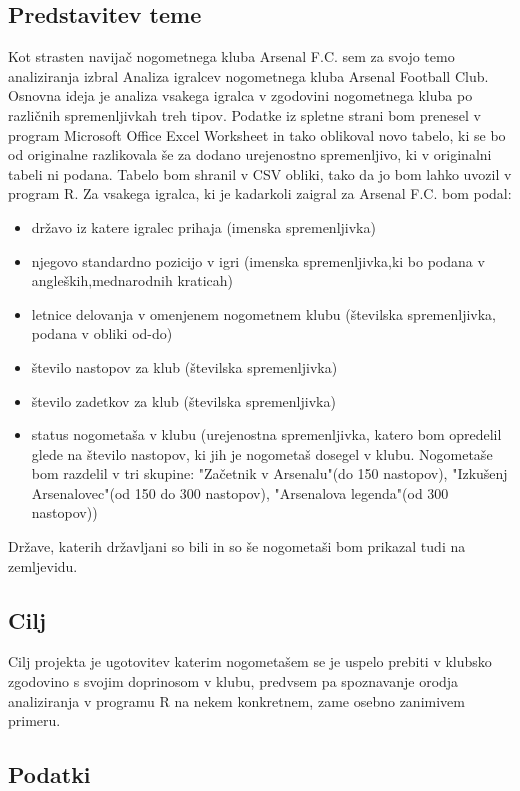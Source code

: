 \documentclass[11pt,a4paper]{article}
\begin{document}
\subsection{Predstavitev teme}
Kot strasten navijač nogometnega kluba Arsenal F.C. sem za svojo temo analiziranja izbral Analiza igralcev nogometnega kluba Arsenal Football Club. Osnovna ideja je analiza vsakega igralca v zgodovini nogometnega kluba po različnih spremenljivkah treh tipov. Podatke iz spletne strani bom prenesel v program  Microsoft Office Excel Worksheet in tako oblikoval novo tabelo, ki se bo od originalne razlikovala še za dodano urejenostno spremenljivo, ki v originalni tabeli ni podana. Tabelo bom shranil v CSV obliki, tako da jo bom lahko uvozil v program  R. Za vsakega igralca, ki je kadarkoli zaigral za Arsenal F.C. bom podal: 
\begin{itemize}
\item{državo iz katere igralec prihaja (imenska spremenljivka)}
\item{njegovo standardno pozicijo v igri (imenska spremenljivka,ki bo podana v angleških,mednarodnih kraticah)}
\item{letnice delovanja v omenjenem nogometnem klubu (številska spremenljivka, podana v obliki od-do)}
\item{število nastopov za klub (številska spremenljivka)}
\item{število zadetkov za klub (številska spremenljivka)}
\item{status nogometaša v klubu (urejenostna spremenljivka, katero bom opredelil glede na število nastopov, ki jih je nogometaš dosegel v klubu. Nogometaše bom razdelil v tri skupine: "Začetnik v Arsenalu"(do 150 nastopov), "Izkušenj Arsenalovec"(od 150 do 300 nastopov), "Arsenalova legenda"(od 300 nastopov))}
\end{itemize}

Države, katerih državljani so bili in so še nogometaši bom prikazal tudi na zemljevidu.

\subsection{Cilj}

Cilj projekta je ugotovitev katerim nogometašem se je uspelo prebiti v klubsko zgodovino s svojim doprinosom v klubu, predvsem pa spoznavanje orodja analiziranja v programu R na nekem konkretnem, zame osebno zanimivem primeru. 

\subsection{Podatki}
\end{document}
